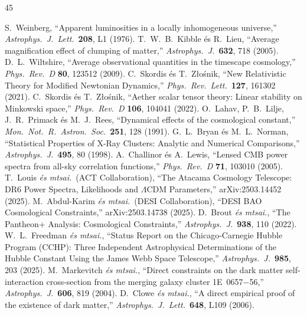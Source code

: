 \documentclass[11pt,a4paper]{article}
\begin{document}
\begin{thebibliography}{45}\raggedright\setlength{\itemsep}{1.5pt}\setlength{\parskip}{0pt}
 S.~Weinberg, ``Apparent luminosities in a locally inhomogeneous universe,'' \textit{Astrophys.\ J.\ Lett.}\ \textbf{208}, L1 (1976).
 T.~W.~B.~Kibble és R.~Lieu, ``Average magnification effect of clumping of matter,'' \textit{Astrophys.\ J.}\ \textbf{632}, 718 (2005).
 D.~L.~Wiltshire, ``Average observational quantities in the timescape cosmology,'' \textit{Phys.\ Rev.\ D} \textbf{80}, 123512 (2009).
 C.~Skordis és T.~Z{\l}o\'snik, ``New Relativistic Theory for Modified Newtonian Dynamics,'' \textit{Phys.\ Rev.\ Lett.}\ \textbf{127}, 161302 (2021).
 C.~Skordis és T.~Z{\l}o\'snik, ``Aether scalar tensor theory: Linear stability on Minkowski space,'' \textit{Phys.\ Rev.\ D} \textbf{106}, 104041 (2022).
 O.~Lahav, P.~B.~Lilje, J.~R.~Primack és M.~J.~Rees, ``Dynamical effects of the cosmological constant,'' \textit{Mon.\ Not.\ R.\ Astron.\ Soc.}\ \textbf{251}, 128 (1991).
 G.~L.~Bryan és M.~L.~Norman, ``Statistical Properties of X-Ray Clusters: Analytic and Numerical Comparisons,'' \textit{Astrophys.\ J.}\ \textbf{495}, 80 (1998).
 A.~Challinor és A.~Lewis, ``Lensed CMB power spectra from all-sky correlation functions,'' \textit{Phys.\ Rev.\ D} \textbf{71}, 103010 (2005).
 T.~Louis \textit{és mtsai.}\ (ACT Collaboration), ``The Atacama Cosmology Telescope: DR6 Power Spectra, Likelihoods and $\Lambda$CDM Parameters,'' arXiv:2503.14452 (2025).
 M.~Abdul-Karim \textit{és mtsai.}\ (DESI Collaboration), ``DESI BAO Cosmological Constraints,'' arXiv:2503.14738 (2025).
 D.~Brout \textit{és mtsai.}, ``The Pantheon+ Analysis: Cosmological Constraints,'' \textit{Astrophys.\ J.}\ \textbf{938}, 110 (2022).
 W.~L.~Freedman \textit{és mtsai.}, ``Status Report on the Chicago-Carnegie Hubble Program (CCHP): Three Independent Astrophysical Determinations of the Hubble Constant Using the James Webb Space Telescope,'' \textit{Astrophys.\ J.}\ \textbf{985}, 203 (2025).
 M.~Markevitch \textit{és mtsai.}, ``Direct constraints on the dark matter self-interaction cross-section from the merging galaxy cluster 1E~0657$-$56,'' \textit{Astrophys.\ J.}\ \textbf{606}, 819 (2004).
 D.~Clowe \textit{és mtsai.}, ``A direct empirical proof of the existence of dark matter,'' \textit{Astrophys.\ J.\ Lett.}\ \textbf{648}, L109 (2006).

\end{thebibliography}
\end{document}
